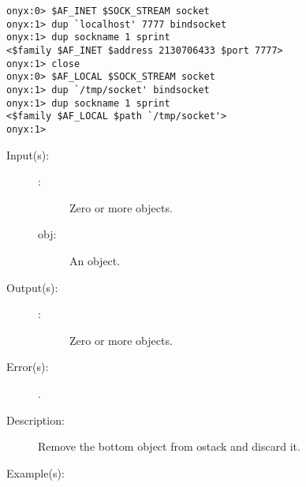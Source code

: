 \begin{description}
\begin{description}
\begin{verbatim}
onyx:0> $AF_INET $SOCK_STREAM socket
onyx:1> dup `localhost' 7777 bindsocket
onyx:1> dup sockname 1 sprint
<$family $AF_INET $address 2130706433 $port 7777>
onyx:1> close
onyx:0> $AF_LOCAL $SOCK_STREAM socket
onyx:1> dup `/tmp/socket' bindsocket
onyx:1> dup sockname 1 sprint
<$family $AF_LOCAL $path `/tmp/socket'>
onyx:1>
		\end{verbatim}
	\end{description}
\label{systemdict:bpop}
\item[{\onyxop{obj \commas}{bpop}{\commas}}: ]
	\begin{description}\item[]
	\item[Input(s): ]
		\begin{description}\item[]
		\item[\commas: ]
			Zero or more objects.
		\item[obj: ]
			An object.
		\end{description}
	\item[Output(s): ]
		\begin{description}\item[]
		\item[\commas: ]
			Zero or more objects.
		\end{description}
	\item[Error(s): ]
		\begin{description}\item[]
		\item[.]
		\end{description}
	\item[Description: ]
		Remove the bottom object from ostack and discard it.
	\item[Example(s): ]\begin{verbatim}


\end{verbatim}
\end{description}
\end{description}
